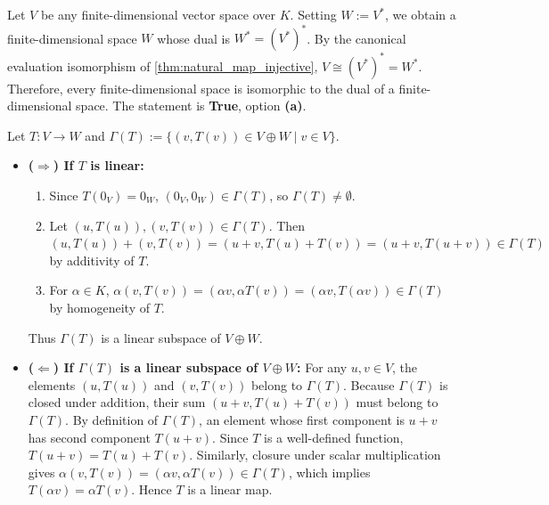\begin{exercisesolution*}
\label{sol:every_finite_dim_is_dual_sc}
Let $V$ be any finite-di\-men\-sional vector space over $K$.
Setting $W := V^*$, we obtain a finite-di\-men\-sional space $W$ whose dual is $W^* = (V^*)^*$.
By the canonical evaluation isomorphism of \cref{thm:natural_map_injective}, $V \cong (V^*)^* = W^*$.
Therefore, every finite-di\-men\-sional space is isomorphic to the dual of a finite-di\-men\-sional space.
The statement is \textbf{True}, option \textbf{(a)}.
\end{exercisesolution*}


\begin{exercisesolution}
\label{sol:graph_of_linear_map}
Let $T \colon V \to W$ and $\Gamma(T) := \{(v, T(v)) \in V \oplus W \mid v \in V\}$.

\begin{itemize}
    \item \textbf{($\Rightarrow$) If $T$ is linear:}
    \begin{enumerate}
        \item Since $T(0_V) = 0_W$, $(0_V, 0_W) \in \Gamma(T)$, so $\Gamma(T) \ne \emptyset$.
        \item Let $(u, T(u)), (v, T(v)) \in \Gamma(T)$. Then $(u, T(u)) + (v, T(v)) = (u+v, T(u)+T(v)) = (u+v, T(u+v)) \in \Gamma(T)$ by additivity of $T$.
        \item For $\alpha \in K$, $\alpha(v, T(v)) = (\alpha v, \alpha T(v)) = (\alpha v, T(\alpha v)) \in \Gamma(T)$ by homogeneity of $T$.
    \end{enumerate}
    Thus $\Gamma(T)$ is a linear subspace of $V \oplus W$.

    \item \textbf{($\Leftarrow$) If $\Gamma(T)$ is a linear subspace of $V \oplus W$:}
    For any $u, v \in V$, the elements $(u, T(u))$ and $(v, T(v))$ belong to $\Gamma(T)$.
    Because $\Gamma(T)$ is closed under addition, their sum $(u+v, T(u)+T(v))$ must belong to $\Gamma(T)$.
    By definition of $\Gamma(T)$, an element whose first component is $u+v$ has second component $T(u+v)$.
    Since $T$ is a well-defined function, $T(u+v) = T(u) + T(v)$.
    Similarly, closure under scalar multiplication gives $\alpha(v, T(v)) = (\alpha v, \alpha T(v)) \in \Gamma(T)$, which implies $T(\alpha v) = \alpha T(v)$.
    Hence $T$ is a linear map.
\end{itemize}
\end{exercisesolution}

